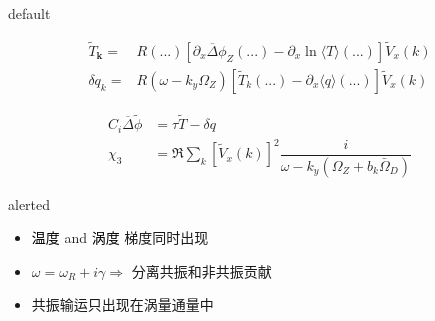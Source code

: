 \documentclass[9pt,aspectratio=169]{ctexbeamer}
\begin{document}
\begin{frame}{\secname}{\subsecname}
\vspace{-0.6cm}
\begin{tbox}{default}
  \begin{minipage}[t]{0.45\textwidth}
    \vspace{-0.2cm}
    \footnotesize
    \begin{align*}
      \widetilde{T}_\mathbf{k}=& R(...)\left[\partial_x\overline{\Delta}\phi_Z(...)-\partial_x\ln \langle T\rangle(...)\right]\tilde{V}_x(k)\\
      \delta q_k=&R(\omega-k_{y}\Omega_Z)\left[\widetilde{T}_k(...)-\partial_{x} \langle q\rangle(...)\right]\widetilde{V}_{x}(k)
    \end{align*}
  \vspace{-0.2cm}
  \end{minipage}
  \hspace{0.3cm}
  \begin{minipage}[t]{0.45\textwidth}
    \footnotesize
    \vspace{-0.2cm}
    \begin{align*}
      C_i\overline{\Delta}\widetilde{\phi} &=\tau\widetilde{T}-\delta q\\
      \chi_3&=\Re\sum_{k}[\tilde{V}_x(k)]^2\dfrac{i}{\omega-k_y\left( \Omega_Z+b_k\bar{\Omega}_D\right)}
    \end{align*}
  \end{minipage}
  \vspace{-0.2cm}
\end{tbox}

\vspace{-0.2cm}
\begin{tbox}{alerted}
  \vspace{-0.1cm}
  \begin{minipage}[t]{0.5\textwidth}
    \begin{itemize}
      \item \textcolor{black}{温度} and \textcolor{black}{涡度} 梯度同时出现\footnotemark[2]
    \end{itemize}
  \end{minipage}
  \hspace{0.1cm}
  \begin{minipage}[t]{0.5\textwidth}
    \begin{itemize}
      \item $ \omega=\omega_R+i\gamma \Rightarrow$ 分离共振和非共振贡献
      \item 共振输运只出现在涡量通量中
    \end{itemize}
  \end{minipage}
\end{tbox}
\end{frame}
\end{document}
